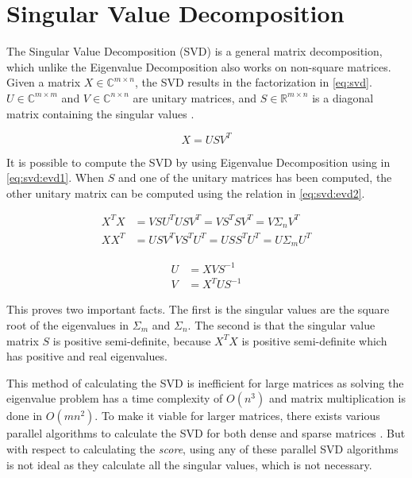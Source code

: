 \section{Singular Value Decomposition}

The Singular Value Decomposition (SVD) is a general matrix decomposition, which unlike the Eigenvalue Decomposition also works on non-square matrices. Given a matrix $X \in \mathbb{C}^{m \times n}$, the SVD results in the factorization in \eqref{eq:svd}. $U \in \mathbb{C}^{m \times m}$ and $V \in \mathbb{C}^{n \times n}$ are unitary matrices, and $S \in \mathbb{R}^{m \times n}$ is a diagonal matrix containing the singular values \cite{kutz:data}.

\begin{equation} \label{eq:svd}
    X = USV^T
\end{equation}

It is possible to compute the SVD by using Eigenvalue Decomposition using in \eqref{eq:svd:evd1}. When $S$ and one of the unitary matrices has been computed, the other unitary matrix can be computed using the relation in \eqref{eq:svd:evd2}.
 
\begin{equation} \label{eq:svd:evd1}
\begin{split} 
    X^T X &= VSU^T USV^T = VS^T SV^T = V \Sigma_n V^T \\
    X X^T &= USV^T VS^TU^T = US S^TU^T = U \Sigma_m U^T
\end{split}
\end{equation}

\begin{equation} \label{eq:svd:evd2}
\begin{split} 
    U &= X V S^{-1} \\
    V &= X^T U S^{-1}
\end{split}
\end{equation}

This proves two important facts. The first is the singular values are the square root of the eigenvalues in $\Sigma_m$ and $\Sigma_n$. The second is that the singular value matrix $S$ is positive semi-definite, because $X^T X$ is positive semi-definite which has positive and real eigenvalues.

This method of calculating the SVD is inefficient for large matrices as solving the eigenvalue problem has a time complexity of $O(n^3)$ and matrix multiplication is done in $O(mn^2)$. To make it viable for larger matrices, there exists various parallel algorithms to calculate the SVD for both dense and sparse matrices \cite[Chapter~4]{erricos:handbook}. But with respect to calculating the \textit{score}, using any of these parallel SVD algorithms is not ideal as they calculate all the singular values, which is not necessary.


